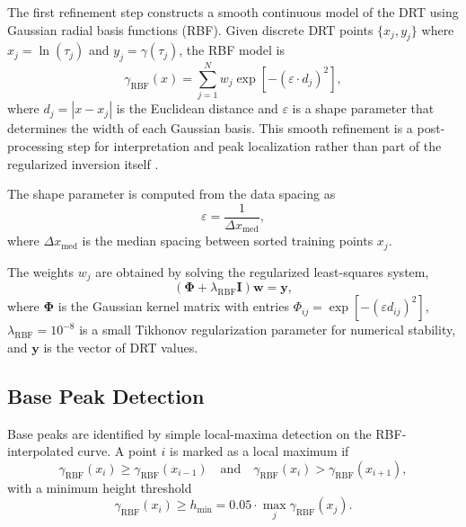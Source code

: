 \documentclass[11pt]{article}
\begin{document}
The first refinement step constructs a smooth continuous model of the DRT using Gaussian radial basis functions (RBF). Given discrete DRT points $\{x_j, y_j\}$ where $x_j = \ln(\tau_j)$ and $y_j = \gamma(\tau_j)$, the RBF model is
\begin{equation}
\gamma_{\mathrm{RBF}}(x) = \sum_{j=1}^{N} w_j \exp\!\left[-(\varepsilon \cdot d_j)^2\right],
\end{equation}
where $d_j = |x - x_j|$ is the Euclidean distance and $\varepsilon$ is a shape parameter that determines the width of each Gaussian basis. This smooth refinement is a post-processing step for interpretation and peak localization rather than part of the regularized inversion itself \cite{danzer2019,maradesa2023}.

The shape parameter is computed from the data spacing as
\begin{equation}
\varepsilon = \frac{1}{\Delta x_{\mathrm{med}}},
\end{equation}
where $\Delta x_{\mathrm{med}}$ is the median spacing between sorted training points $x_j$.

The weights $w_j$ are obtained by solving the regularized least-squares system,
\begin{equation}
\left(\mathbf{\Phi} + \lambda_{\mathrm{RBF}} \mathbf{I}\right) \mathbf{w} = \mathbf{y},
\end{equation}
where $\mathbf{\Phi}$ is the Gaussian kernel matrix with entries $\Phi_{ij} = \exp[-({\varepsilon d_{ij}})^2]$, $\lambda_{\mathrm{RBF}} = 10^{-8}$ is a small Tikhonov regularization parameter for numerical stability, and $\mathbf{y}$ is the vector of DRT values.

\subsection{Base Peak Detection}

Base peaks are identified by simple local-maxima detection on the RBF-interpolated curve. A point $i$ is marked as a local maximum if
\begin{equation}
\gamma_{\mathrm{RBF}}(x_i) \geq \gamma_{\mathrm{RBF}}(x_{i-1}) \quad \text{and} \quad \gamma_{\mathrm{RBF}}(x_i) > \gamma_{\mathrm{RBF}}(x_{i+1}),
\end{equation}
with a minimum height threshold
\begin{equation}
\gamma_{\mathrm{RBF}}(x_i) \geq h_{\min} = 0.05 \cdot \max_j \gamma_{\mathrm{RBF}}(x_j).
\end{equation}
\end{document}
